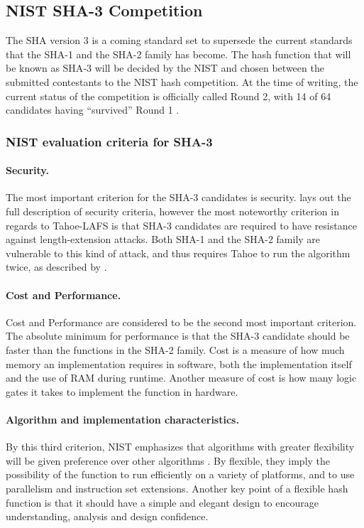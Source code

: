 \documentclass[english,12pt,a4paper]{book}
\begin{document}
\subsection{NIST SHA-3 Competition}
The \ac{SHA} version 3 is a coming standard set to supersede the current
standards that the \ac{SHA}-1 and the \ac{SHA}-2 family has become. The hash
function that will be known as \ac{SHA}-3 will be decided by the \ac{NIST} and
chosen between the submitted contestants to the \ac{NIST} hash competition.
At the time of writing, the current status of the competition is officially
called Round 2, with 14 of 64 candidates having ``survived'' Round 1
\cite{s_fedreg}.

\subsubsection{NIST evaluation criteria for SHA-3}

\label{sec:lengthextension}
\paragraph{Security.} The most important criterion for the SHA-3
candidates\cite{s_nistround2} is security. \citet{s_fedreg} lays out the full
description of security criteria, however the most noteworthy criterion
in regards to Tahoe-\ac{LAFS} is that \ac{SHA}-3 candidates are required to have
resistance against length-extension attacks. Both \ac{SHA}-1 and the \ac{SHA}-2
family are vulnerable to this kind of attack, and thus requires
Tahoe to run the algorithm twice, as described by \citet{schneier}.

\paragraph{Cost and Performance.} Cost and Performance are considered to be the
second most important criterion. The absolute minimum for performance is that the
SHA-3 candidate should be faster than the functions in the \ac{SHA}-2 family.
Cost is a measure of how much memory an implementation requires in software,
both the implementation itself and the use of \ac{RAM} during runtime. Another
measure of cost is how many logic gates it takes to implement the function in
hardware.

\paragraph{Algorithm and implementation characteristics.} By this third criterion,
\ac{NIST} emphasizes that algorithms with greater flexibility will be given
preference over other algorithms \cite{s_nistround2}. By flexible, they imply
the possibility of the function to run efficiently on a variety of platforms,
and to use parallelism and instruction set extensions. Another key point of a
flexible hash function is that it should have a simple and elegant design to
encourage understanding, analysis and design confidence.
\end{document}
